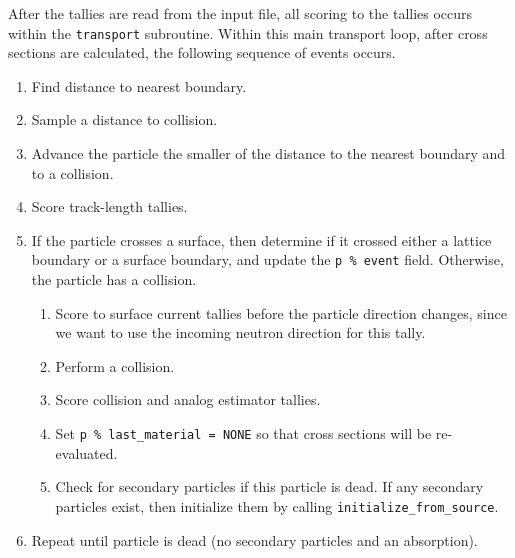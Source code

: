 \documentclass[10pt]{article}
\newcounter{subsubsubsection}[subsubsection]
\numberwithin{equation}{section} %
\begin{document}

After the tallies are read from the input file, all scoring to the tallies occurs within the {\tt transport} subroutine. Within this main transport loop, after cross sections are calculated, the following sequence of events occurs.

\begin{enumerate}
\item Find distance to nearest boundary.
\item Sample a distance to collision. 
\item Advance the particle the smaller of the distance to the nearest boundary and to a collision. %
\item Score track-length tallies.%
\item If the particle crosses a surface, then determine if it crossed either a lattice boundary or a surface boundary, and update the {\tt p \% event} field. Otherwise, the particle has a collision. %
	\begin{enumerate}
	\item Score to surface current tallies before the particle direction changes, since we want to use the incoming neutron direction for this tally.
	\item Perform a collision. %
	\item Score collision and analog estimator tallies. %
	\item Set {\tt p \% last\_material = NONE} so that cross sections will be re-evaluated. 
	\item Check for secondary particles if this particle is dead. If any secondary particles exist, then initialize them by calling {\tt initialize\_from\_source}. 
	\end{enumerate}
	\item Repeat until particle is dead (no secondary particles and an absorption).
\end{enumerate}
\end{document}
